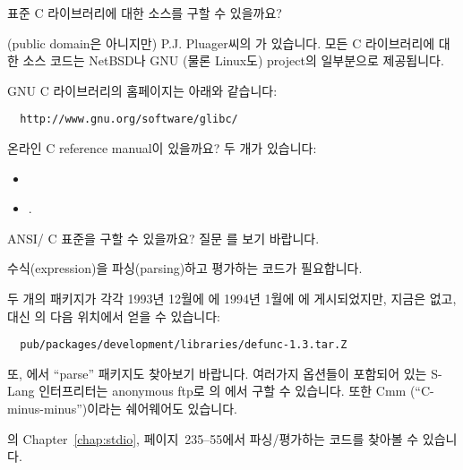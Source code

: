 \begin{faq}
	표준 C 라이브러리에 대한 소스를 구할 수 있을까요?

\A
	(public domain은 아니지만) P.J.  Pluager씨의
	가 있습니다.
	모든 C 라이브러리에 대한 소스 코드는 NetBSD나
	GNU (물론 Linux도) project의 일부분으로 제공됩니다.

\T
	GNU C 라이브러리의 홈페이지는 아래와 같습니다:
\begin{verbatim}
  http://www.gnu.org/software/glibc/
\end{verbatim}

\end{faq}

\begin{faq}
	온라인 C reference manual이 있을까요?
\A
	두 개가 있습니다:
	\begin{itemize}
	\item {}
	\item {}.
	\end{itemize}
\end{faq}

\begin{faq}
	ANSI/\cite{c89} C 표준을 구할 수 있을까요?
\A
	질문 를 보기 바랍니다.
\end{faq}

\begin{faq}
	수식(expression)을 파싱(parsing)하고 평가하는 코드가 필요합니다.
\A

	두 개의 패키지가 각각 1993년 12월에 에 
	1994년 1월에 에 게시되었지만, 지금은 없고,
	대신 의 다음 위치에서 얻을 수 있습니다:
\begin{verbatim}
  pub/packages/development/libraries/defunc-1.3.tar.Z
\end{verbatim}
	또, 에서 ``parse'' 패키지도
        찾아보기 바랍니다.
	여러가지 옵션들이 포함되어 있는 S-Lang 인터프리터는 anonymous ftp로
	의 에서 구할 수 있습니다.
	또한 Cmm (``C-minus-minus'')이라는 쉐어웨어도 있습니다.

	의
	Chapter~\ref{chap:stdio},
        \mbox{페이지 235--55}에서 파싱/평가하는 코드를
        찾아볼 수 있습니다.
\end{faq}


